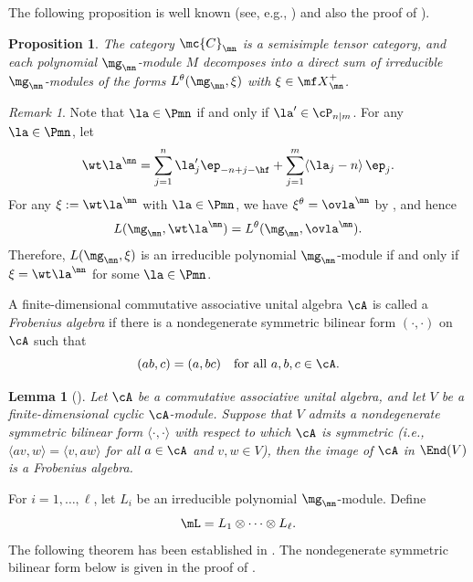 \documentclass[11pt, reqno]{amsart}
\newtheorem{lem}[thm]{Lemma}
\newtheorem{prop}[thm]{Proposition}
\theoremstyle{definition}
\theoremstyle{remark}
\newtheorem{rem}[thm]{Remark}
\numberwithin{equation}{section}
\begin{document}
The following proposition is well known (see, e.g., \cite[Theorem 3.26 and Theorem 3.27]{CW}) and also the proof of \cite[Theorem 6.2.2]{Lus}).

\begin{prop}\label{Cmn}
The category $\mc{C}_\mn$ is a semisimple tensor category, and each polynomial $\mg_\mn$-module $M$ decomposes into a direct sum of irreducible $\mg_\mn$-modules of the forms $L^\theta(\mg_\mn,\xi)$ with $\xi \in {\mf X}^+_\mn$.
 \end{prop}

\begin{rem}
Note that $\la \in \Pmn$ if and only if  $\la^\prime \in \cP_{n|m}$.
For any $\la \in \Pmn$,
let
\begin{equation} \label{weight-wtla}
\wt\la^\mn= \sum_{j=1}^{n} \la^\prime_{j}  \ep_{-n+j-\hf}   +\sum_{j=1}^m\langle\la_j-n\rangle\, \ep_j.
\end{equation}
For any $\xi:=\wt\la^\mn$ with $\la \in \Pmn$, we have $\xi^\theta=\ovla^\mn$ by \cite[Theorem 2.55]{CW}, and hence
\begin{equation} \label{L-theta}
L(\mg_\mn,\wt\la^\mn)=L^\theta(\mg_\mn,\ovla^\mn).
\end{equation}
Therefore, $L(\mg_\mn,\xi)$  is an irreducible polynomial $\mg_\mn$-module if and only if $\xi=\wt\la^\mn$ for some $\la\in \Pmn$.
\end{rem}


A  finite-dimensional commutative associative unital algebra $\cA$ is called a \emph{Frobenius algebra} if there is a nondegenerate symmetric bilinear form $(\cdot, \cdot)$ on $\cA$ such that
$$
(ab, c)=(a, bc) \quad \mbox{for all $a, b, c \in \cA$.}
$$

\begin{lem} [{\cite[Lemma 2.7]{Lu20}}] \label{cyc-Frob}
Let $\cA$ be a commutative associative unital algebra, and let $V$ be a finite-dimensional cyclic $\cA$-module.
Suppose that $V$ admits a nondegenerate symmetric bilinear form $\langle \cdot, \cdot \rangle$ with respect to which $\cA$ is symmetric (i.e., $\langle av, w \rangle=\langle v, aw \rangle$ for all $a \in \cA$ and $v, w \in V$), then the image of $\cA$ in $\End(V)$ is a Frobenius algebra.
\end{lem}


For $i=1, \ldots, \ell$, let $L_i$ be an irreducible polynomial $\mg_\mn$-module.
Define
$$
\mL=L_1 \otimes \cdots \otimes L_\ell.
$$
The following theorem has been established in \cite[Theorem 4.7 and Theorem 4.10]{ChL25}.
The nondegenerate symmetric bilinear form below is given in the proof of \cite[Theorem 4.7]{ChL25}.
\end{document}
